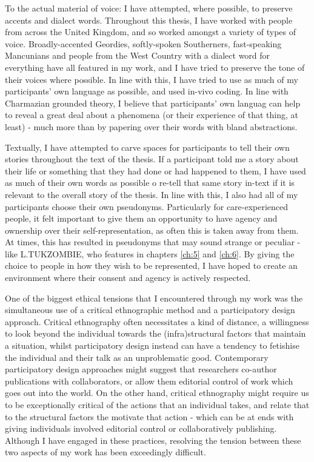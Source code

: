 To the actual material of voice: I have attempted, where possible, to preserve accents and dialect words. Throughout this thesis, I have worked with people from across the United Kingdom, and so worked amongst a variety of types of voice. Broadly-accented Geordies, softly-spoken Southerners, fast-speaking Mancunians and people from the West Country with a dialect word for everything have all featured in my work, and I have tried to preserve the tone of their voices where possible. In line with this, I have tried to use as much of my participants' own language as possible, and used in-vivo coding. In line with Charmazian grounded theory, I believe that participants' own languag can help to reveal a great deal about a phenomena (or their experience of that thing, at least) - much more than by papering over their words with bland abstractions.   

Textually, I have attempted to carve spaces for participants to tell their own stories throughout the text of the thesis. If a participant told me a story about their life or something that they had done or had happened to them, I have used as much of their own words as possible o re-tell that same story in-text if it is relevant to the overall story of the thesis. In line with this, I also had all of my participants choose their own pseudonyms. Particularly for care-experienced people, it felt important to give them an opportunity to have agency and ownership over their self-representation, as often this is taken away from them. At times, this has resulted in pseudonyms that may sound strange or peculiar - like L.TUKZOMBIE, who features in chapters \ref{ch:5} and \ref{ch:6}. By giving the choice to people in how they wish to be represented, I have hoped to create an environment where their consent and agency is actively respected.

One of the biggest ethical tensions that I encountered through my work was the simultaneous use of a critical ethnographic method and a participatory design approach. Critical ethnography often necessitates a kind of distance, a willingness to look beyond the individual towards the (infra)structural factors that maintain a situation, whilst participatory design instead can have a tendency to fetishise the individual and their talk as an unproblematic good. Contemporary participatory design approaches might suggest that researchers co-author publications with collaborators, or allow them editorial control of work which goes out into the world. On the other hand, critical ethnography might require us to be exceptionally critical of the actions that an individual takes, and relate that to the structural factors the motivate that action - which can be at ends with giving individuals involved editorial control or collaboratively publishing. Although I have engaged in these practices, resolving the tension between these two aspects of my work has been exceedingly difficult.

